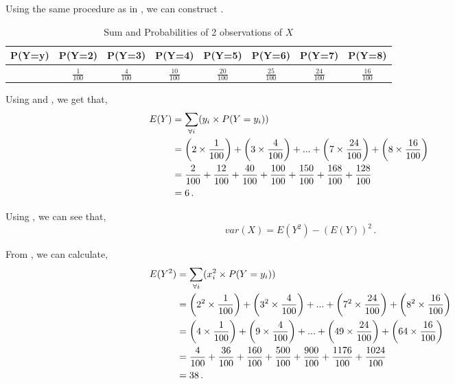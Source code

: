 \begin{subquestions}
\begin{subsubquestions}

\subsubquestion

Using the same procedure as in , we can construct .
\begin{table}[H]
	\centering
	\begin{tabular}{|c|c|c|c|c|c|c|c|}
		\hline
		P(Y=y) & P(Y=2) &P(Y=3) &P(Y=4) &P(Y=5) &P(Y=6) &P(Y=7) &P(Y=8) \\
		\hline 
		 & $\frac{1}{100}$  &
		 $\frac{4}{100}$  &
		 $\frac{10}{100}$ & 
		 $\frac{20}{100}$  &
		 $\frac{25}{100}$   &
		 $\frac{24}{100}$  &
		$\frac{16}{100}$  \\
		\hline
	\end{tabular}
	\caption{\label{2008J:q4:Ytab2} Sum and Probabilities of 2 observations of $X$}	
\end{table}


\subsubquestion

Using  and , we get that,
\begin{align} \hspace{-70pt}
	E(Y)  & = \sum_{\forall i} (y_i \times P(Y=y_i)) \nn \\
	      & = \left(2 \times \frac{1}{100}\right) + \left(3 \times \frac{4}{100}\right) + ... +  \left(7 \times \frac{24}{100}\right) + \left(8 \times \frac{16}{100}\right) \nn \\
	      & = \frac{2}{100}+ \frac{12}{100}+ \frac{40}{100}+ \frac{100}{100}+ \frac{150}{100}+ \frac{168}{100}+ \frac{128}{100} \nn \\
	      & = 6 \,.
\end{align}

Using , we can see that,
\begin{equation}
	var(X) = E(Y^2) - (E(Y))^2 \,. \label{2008J:q4:Var}
\end{equation}

From , we can calculate,
\begin{align}
	E(Y^2) & = \sum_{\forall i}(x_i^2 \times P(Y=y_i)) \nonumber \\
		   & = \left(2^2 \times \frac{1}{100}\right) + \left(3^2 \times \frac{4}{100}\right) + ... +  \left(7^2 \times \frac{24}{100}\right) + \left(8^2 \times \frac{16}{100}\right) \nonumber \\
		   & = \left(4 \times \frac{1}{100}\right) + \left(9 \times \frac{4}{100}\right) + ... +  \left(49 \times \frac{24}{100}\right) + \left(64 \times \frac{16}{100}\right) \nonumber \\
		   &= \frac{4}{100}+\frac{36}{100}+\frac{160}{100}+\frac{500}{100}+\frac{900}{100}+\frac{1176}{100}+\frac{1024}{100} \nonumber \\
		   & = 38 \,.
\end{align}


\end{subsubquestions}
\end{subquestions}
